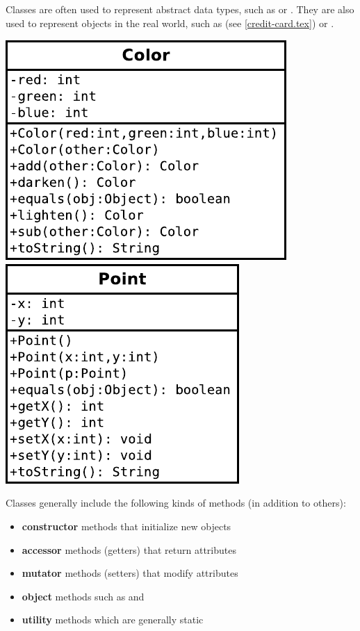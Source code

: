 
Classes are often used to represent abstract data types, such as  or .
They are also used to represent objects in the real world, such as  (see \ref{credit-card.tex}) or .

\begin{center}
\includegraphics{Color.pdf}  %
~~~~~
\includegraphics{Point.pdf}  %
\end{center}

Classes generally include the following kinds of methods (in addition to others):
\begin{itemize}[itemsep=0pt]
\item \textbf{constructor} methods that initialize new objects
\item \textbf{accessor} methods (getters) that return attributes
\item \textbf{mutator} methods (setters) that modify attributes
\item \textbf{object} methods such as  and 
\item \textbf{utility} methods which are generally static
\end{itemize}


